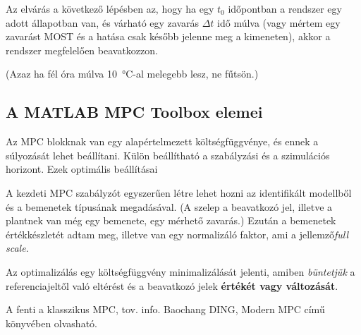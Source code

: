 Az elvárás a következő lépésben az, hogy ha egy $t_0$ időpontban a rendszer egy adott állapotban van, és várható egy zavarás $\Delta t$ idő múlva (vagy mértem egy zavarást MOST és a hatása csak később jelenne meg a kimeneten), akkor a rendszer megfelelően beavatkozzon.

(Azaz ha fél óra múlva \SI{10}{\celsius}-al melegebb lesz, ne fűtsön.)

\subsection{A MATLAB MPC Toolbox elemei}
Az MPC blokknak van egy alapértelmezett költségfüggvénye, és ennek a súlyozását lehet beállítani.
Külön beállítható a szabályzási és a szimulációs horizont.
Ezek optimális beállításai 

A kezdeti MPC szabályzót egyszerűen létre lehet hozni az identifikált modellből és a bemenetek típusának megadásával. (A szelep a beavatkozó jel, illetve a plantnek van még egy bemenete, egy mérhető zavarás.) Ezután a bemenetek értékkészletét adtam meg, illetve van egy normalizáló faktor, ami a jellemző\textit{full scale}.

Az optimalizálás egy költségfüggvény minimalizálását jelenti, amiben \textit{büntetjük} a referenciajeltől való eltérést és a beavatkozó jelek \textbf{értékét vagy változását}.

A fenti a klasszikus MPC, tov. info. Baochang DING, Modern MPC című könyvében olvasható.


